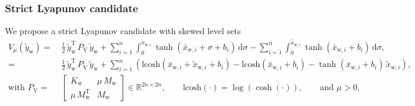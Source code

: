 \subsubsection{Strict Lyapunov candidate}
We propose a strict Lyapunov candidate with skewed level sets~\cite{wu2022passive}
\begin{equation}\label{eq:con:conw_lyapunov_function}
\begin{split}
    V_\mu(\tilde{y}_\mathrm{w}) =& \: \frac{1}{2} \, \tilde{y}_\mathrm{w}^\mathrm{T} \, P_\mathrm{V} \, \tilde{y}_\mathrm{w} + \sum_{i=1}^n \int_{0}^{\tilde{x}_{\mathrm{w},i}} \tanh(\bar{x}_{\mathrm{w},i}+\sigma+b_i) \, \mathrm{d} \sigma - \sum_{i=1}^n \int_{0}^{\tilde{x}_{\mathrm{w},i}} \tanh(\bar{x}_{\mathrm{w},i}+b_i) \, \mathrm{d} \sigma,\\
    =& \: \frac{1}{2} \, \tilde{y}_\mathrm{w}^\mathrm{T} \, P_\mathrm{V} \, \tilde{y}_\mathrm{w} + \sum_{i=1}^n \left ( \mathrm{lcosh}(\bar{x}_{\mathrm{w},i} + \tilde{x}_{\mathrm{w},i}+b_i)-\mathrm{lcosh}(\bar{x}_{\mathrm{w},i}+b_i)-\tanh(\bar{x}_{\mathrm{w},i}+b_i) \, \tilde{x}_{\mathrm{w},i} \right ),\\
    \text{with } P_\mathrm{V} =& \: \begin{bmatrix}
        K_\mathrm{w} & \mu \, M_\mathrm{w}\\
        \mu \, M_\mathrm{w}^\mathrm{T} & M_\mathrm{w}
    \end{bmatrix} \in \mathbb{R}^{2n \times 2n}, \qquad \mathrm{lcosh}(\cdot) = \log(\cosh(\cdot)), \qquad \text{and } \mu > 0.
\end{split}
\end{equation}

